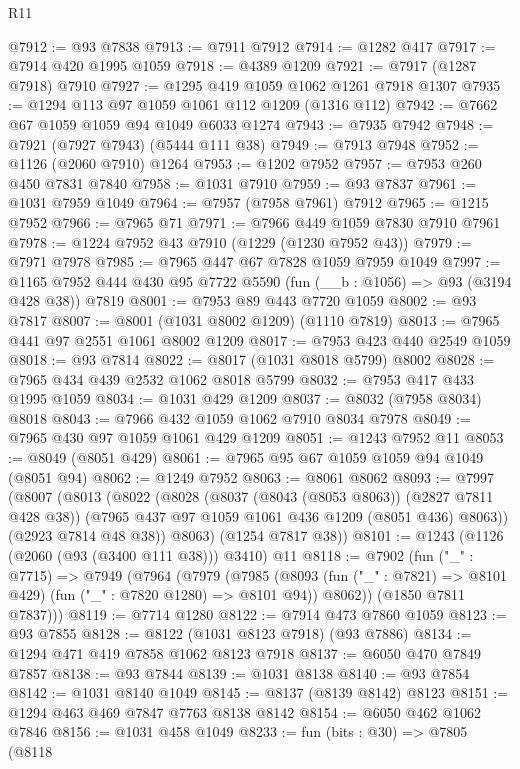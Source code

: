 \begin{lexlean}{R11}
\begin{coremodule}
@7912 := @93 @7838
@7913 := @7911 @7912
@7914 := @1282 @417
@7917 := @7914 @420 @1995 @1059
@7918 := @4389 @1209
@7921 := @7917 (@1287 @7918) @7910
@7927 := @1295 @419 @1059 @1062 @1261 @7918 @1307
@7935 := @1294 @113 @97 @1059 @1061 @112 @1209 (@1316 @112)
@7942 := @7662 @67 @1059 @1059 @94 @1049 @6033 @1274
@7943 := @7935 @7942
@7948 := @7921 (@7927 @7943) (@5444 @111 @38)
@7949 := @7913 @7948
@7952 := @1126 (@2060 @7910) @1264
@7953 := @1202 @7952
@7957 := @7953 @260 @450 @7831 @7840
@7958 := @1031 @7910
@7959 := @93 @7837
@7961 := @1031 @7959 @1049
@7964 := @7957 (@7958 @7961) @7912
@7965 := @1215 @7952
@7966 := @7965 @71
@7971 := @7966 @449 @1059 @7830 @7910 @7961
@7978 := @1224 @7952 @43 @7910 (@1229 (@1230 @7952 @43))
@7979 := @7971 @7978
@7985 := @7965 @447 @67 @7828 @1059 @7959 @1049
@7997 := @1165 @7952 @444 @430 @95 @7722 @5590 (fun (__b : @1056) => @93 (@3194 @428 @38)) @7819
@8001 := @7953 @89 @443 @7720 @1059
@8002 := @93 @7817
@8007 := @8001 (@1031 @8002 @1209) (@1110 @7819)
@8013 := @7965 @441 @97 @2551 @1061 @8002 @1209
@8017 := @7953 @423 @440 @2549 @1059
@8018 := @93 @7814
@8022 := @8017 (@1031 @8018 @5799) @8002
@8028 := @7965 @434 @439 @2532 @1062 @8018 @5799
@8032 := @7953 @417 @433 @1995 @1059
@8034 := @1031 @429 @1209
@8037 := @8032 (@7958 @8034) @8018
@8043 := @7966 @432 @1059 @1062 @7910 @8034 @7978
@8049 := @7965 @430 @97 @1059 @1061 @429 @1209
@8051 := @1243 @7952 @11
@8053 := @8049 (@8051 @429)
@8061 := @7965 @95 @67 @1059 @1059 @94 @1049 (@8051 @94)
@8062 := @1249 @7952
@8063 := @8061 @8062
@8093 := @7997
    (@8007
      (@8013
        (@8022
          (@8028
            (@8037 (@8043 (@8053 @8063)) (@2827 @7811 @428 @38))
            (@7965 @437 @97 @1059 @1061 @436 @1209 (@8051 @436) @8063))
          (@2923 @7814 @48 @38))
        @8063)
      (@1254 @7817 @38))
@8101 := @1243 (@1126 (@2060 (@93 (@3400 @111 @38))) @3410) @11
@8118 := @7902
    (fun ("_" : @7715) =>
    @7949
      (@7964
        (@7979
          (@7985
            (@8093 (fun ("_" : @7821) => @8101 @429) (fun ("_" : @7820 @1280) => @8101 @94))
            @8062))
        (@1850 @7811 @7837)))
@8119 := @7714 @1280
@8122 := @7914 @473 @7860 @1059
@8123 := @93 @7855
@8128 := @8122 (@1031 @8123 @7918) (@93 @7886)
@8134 := @1294 @471 @419 @7858 @1062 @8123 @7918
@8137 := @6050 @470 @7849 @7857
@8138 := @93 @7844
@8139 := @1031 @8138
@8140 := @93 @7854
@8142 := @1031 @8140 @1049
@8145 := @8137 (@8139 @8142) @8123
@8151 := @1294 @463 @469 @7847 @7763 @8138 @8142
@8154 := @6050 @462 @1062 @7846
@8156 := @1031 @458 @1049
@8233 := fun (bits : @30) =>
  @7805
    (@8118

\end{coremodule}
\end{lexlean}
